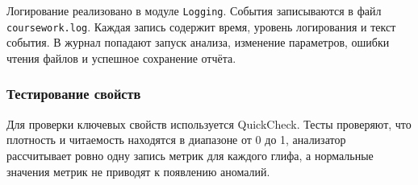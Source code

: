 Логирование реализовано в модуле \texttt{Logging}. События записываются в файл \texttt{coursework.log}. Каждая запись содержит время, уровень логирования и текст события. В журнал попадают запуск анализа, изменение параметров, ошибки чтения файлов и успешное сохранение отчёта.

\subsubsection{Тестирование свойств}

Для проверки ключевых свойств используется QuickCheck. Тесты проверяют, что плотность и читаемость находятся в диапазоне от 0 до 1, анализатор рассчитывает ровно одну запись метрик для каждого глифа, а нормальные значения метрик не приводят к появлению аномалий.

\newpage
